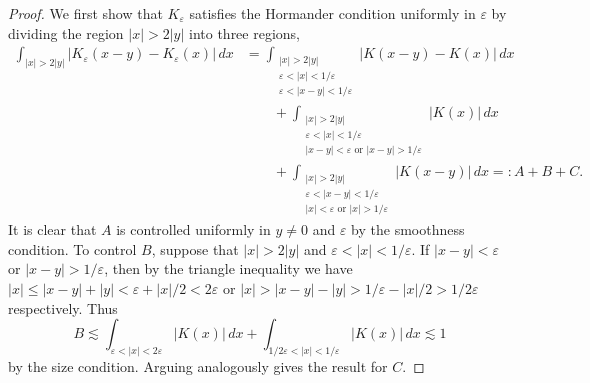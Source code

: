 \documentclass[reqno]{amsart}
\theoremstyle{definition}
\theoremstyle{remark}
\renewcommand{\epsilon}{\varepsilon}
\begin{document}
\begin{proof}
	We first show that $K_\epsilon$ satisfies the Hormander condition uniformly in $\epsilon$ by dividing the region $|x| > 2|y|$ into three regions, 
		\begin{align*}
			\int_{|x| > 2|y|} |K_\epsilon (x - y) - K_\epsilon (x)|\, dx
				&= \int_{\substack{|x| > 2|y| \\ \epsilon < |x| < 1/\epsilon \\ \epsilon < |x - y| < 1/\epsilon}} |K(x - y) - K(x)| \, dx \\
				&\qquad + \int_{\substack{|x| > 2|y| \\ \epsilon < |x| < 1/\epsilon \\ |x - y| < \epsilon \text{ or } |x - y| > 1/\epsilon}} |K(x)| \, dx \\
				&\qquad + \int_{\substack{|x| > 2|y| \\ \epsilon < |x - y| < 1/\epsilon \\ |x | < \epsilon \text{ or } |x| > 1/\epsilon}} | K(x - y)| \, dx =: A + B + C.
		\end{align*}	
	It is clear that $A$ is controlled uniformly in $y \neq 0$ and $\epsilon$ by the smoothness condition. To control $B$, suppose that $|x| > 2|y|$ and $\epsilon < |x| < 1/\epsilon$. If $|x - y| < \epsilon$ or $|x - y| > 1/\epsilon$, then by the triangle inequality we have $|x| \leq |x - y| + |y| < \epsilon + |x|/2 < 2\epsilon$ or $|x| > |x - y| - |y| > 1/\epsilon - |x|/2 > 1/2\epsilon$ respectively. Thus 
		\[ B \lesssim \int_{\epsilon < |x| < 2\epsilon} |K(x)| \, dx + \int_{1/2\epsilon < |x| < 1/\epsilon} |K(x)| \, dx \lesssim 1 \]
	by the size condition. Arguing analogously gives the result for $C$. 
	

\end{proof}
\end{document}
